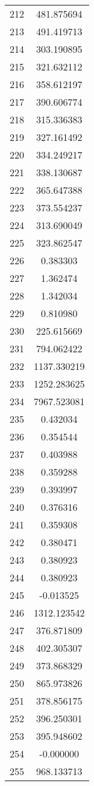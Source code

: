 \documentclass[12pt]{article}
\begin{document}
\begin{longtable}{@{}cc@{}}
212 & 481.875694 \\
213 & 491.419713 \\
214 & 303.190895 \\
215 & 321.632112 \\
216 & 358.612197 \\
217 & 390.606774 \\
218 & 315.336383 \\
219 & 327.161492 \\
220 & 334.249217 \\
221 & 338.130687 \\
222 & 365.647388 \\
223 & 373.554237 \\
224 & 313.690049 \\
225 & 323.862547 \\
226 & 0.383303 \\
227 & 1.362474 \\
228 & 1.342034 \\
229 & 0.810980 \\
230 & 225.615669 \\
231 & 794.062422 \\
232 & 1137.330219 \\
233 & 1252.283625 \\
234 & 7967.523081 \\
235 & 0.432034 \\
236 & 0.354544 \\
237 & 0.403988 \\
238 & 0.359288 \\
239 & 0.393997 \\
240 & 0.376316 \\
241 & 0.359308 \\
242 & 0.380471 \\
243 & 0.380923 \\
244 & 0.380923 \\
245 & -0.013525 \\
246 & 1312.123542 \\
247 & 376.871809 \\
248 & 402.305307 \\
249 & 373.868329 \\
250 & 865.973826 \\
251 & 378.856175 \\
252 & 396.250301 \\
253 & 395.948602 \\
254 & -0.000000 \\
255 & 968.133713 \\

\end{longtable}
\end{document}

